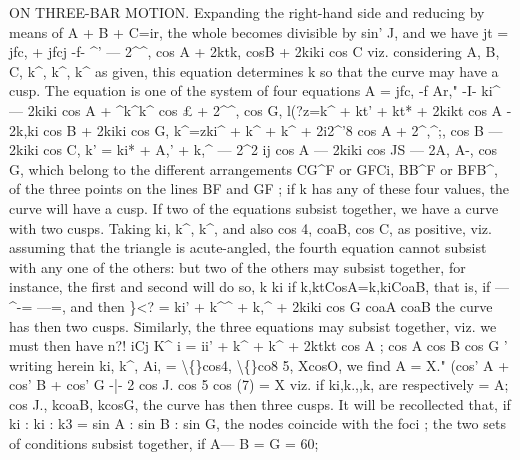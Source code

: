 \documentclass[11pt,a4paper]{book}
\begin{document}
ON THREE-BAR MOTION.
Expanding
the
right-hand
side
and
reducing
by means
of A + B + C=ir,
the
whole
becomes
divisible by
sin' J, and we have
jt\guillemotright{} = jfc,\guillemotright{} +
jfcj\guillemotright{} -f- \textasciicircum{}' --- 2\textasciicircum{}\textasciicircum{}, cos A + 2ktk, cosB + 2kiki cos C
viz.
considering A,
B,
C,
k\textasciicircum{},
k\textasciicircum{},
k\textasciicircum{}
as
given,
this
equation
determines k
so
that
the
curve may have a cusp.
The equation
is one of the system
of four equations
A\guillemotleft{} = jfc,\guillemotright{} -f Ar," -I- ki\textasciicircum{} --- 2kiki cos A + \textasciicircum{}k\textasciicircum{}k\textasciicircum{} cos \pounds{} + 2\textasciicircum{}\textasciicircum{}, cos G,
l(?z=k\textasciicircum{} + kt' + kt* + 2kikt cos A - 2k,ki cos B + 2kiki cos G,
k\textasciicircum{}=zki\textasciicircum{} + k\textasciicircum{} + k\textasciicircum{} + 2i2\textasciicircum{}'8 cos A + 2\textasciicircum{},\textasciicircum{};, cos B --- 2kiki cos C,
k' = ki* + A,' + k,\textasciicircum{} --- 2\textasciicircum{}2 ij cos A --- 2kiki cos JS --- 2A, A-, cos G,
which
belong to
the
different arrangements CG\textasciicircum{}F or GFCi, BB\textasciicircum{}F or BFB\textasciicircum{}, of the three
points
on
the
lines BF and GF
;
if k
has
any
of
these
four
values,
the
curve
will
have
a
cusp.
If two
of
the
equations
subsist
together,
we
have
a
curve
with
two
cusps.
Taking
ki,
k\textasciicircum{},
k\textasciicircum{}, and
also
cos 4, coaB, cos C, as
positive,
viz.
assuming that the
triangle
is acute-angled, the
fourth
equation cannot subsist with any one
of the others:
but two of the others may subsist
together,
for instance, the
first and second
will do
so,
k
ki
if k,ktCosA=k,kiCoaB, that
is,
if ---\textasciicircum{}-= ---=, and
then
\}<? = ki' + k\textasciicircum{}\textasciicircum{} + k,\textasciicircum{} + 2kiki cos G
coaA
coaB
the curve
has then
two
cusps.
Similarly, the
three equations may subsist together,
viz.
we must then have
n?!
iCj
K\textasciicircum{}
i\guillemotright{} = ii' + k\textasciicircum{} + k\textasciicircum{} + 2ktkt cos A
;
cos A
cos B
cos G
'
writing herein
ki,
k\textasciicircum{},
Ai, = \textbackslash\{\}cos4, \textbackslash\{\}co8 5, XcosO, we
find
A\guillemotright{} = X." (cos' A + cos' B + cos' G -|- 2 cos J. cos 5 cos (7) = X\guillemotright{}
viz.
if ki,k.,,k, are respectively = A; cos J., kcoaB, kcosG, the
curve has then three
cusps.
It
will be recollected
that,
if
ki
:
ki
:
k3 = sin A
: sin B
: sin G,
the
nodes
coincide
with
the
foci
;
the
two
sets
of
conditions
subsist
together,
if
A--- B = G = 60\textdegree{};
\end{document}
